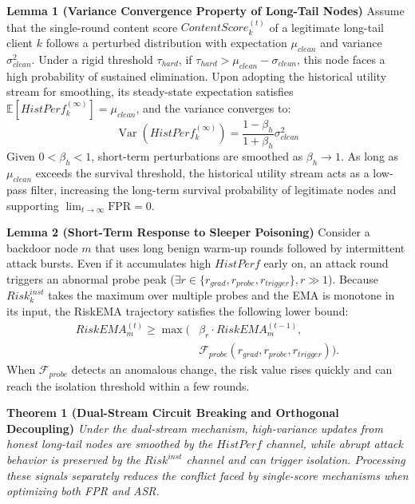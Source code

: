 \documentclass[final,5p,times,twocolumn]{elsarticle/elsarticle}
\begin{document}
\textbf{Lemma 1 (Variance Convergence Property of Long-Tail Nodes)}
Assume that the single-round content score $ContentScore_{k}^{(t)}$ of a legitimate long-tail client $k$ follows a perturbed distribution with expectation $\mu_{clean}$ and variance $\sigma_{clean}^2$. Under a rigid threshold $\tau_{hard}$, if $\tau_{hard} > \mu_{clean} - \sigma_{clean}$, this node faces a high probability of sustained elimination. Upon adopting the historical utility stream for smoothing, its steady-state expectation satisfies $\mathbb{E}[HistPerf_k^{(\infty)}] = \mu_{clean}$, and the variance converges to:
\begin{equation}
    \operatorname{Var}(HistPerf_{k}^{(\infty)}) = \frac{1-\beta_h}{1+\beta_h} \sigma_{clean}^{2}
\end{equation}
Given $0 < \beta_h < 1$, short-term perturbations are smoothed as $\beta_h \to 1$. As long as $\mu_{clean}$ exceeds the survival threshold, the historical utility stream acts as a low-pass filter, increasing the long-term survival probability of legitimate nodes and supporting $\lim_{t \to \infty} \text{FPR} = 0$.

\textbf{Lemma 2 (Short-Term Response to Sleeper Poisoning)}
Consider a backdoor node $m$ that uses long benign warm-up rounds followed by intermittent attack bursts. Even if it accumulates high $HistPerf$ early on, an attack round triggers an abnormal probe peak ($\exists r \in \{r_{grad}, r_{probe}, r_{trigger}\}, r \gg 1$). Because $Risk_k^{inst}$ takes the maximum over multiple probes and the EMA is monotone in its input, the RiskEMA trajectory satisfies the following lower bound:
\begin{equation}
    \begin{aligned}
        RiskEMA_m^{(t)} \ge
        \max \big( & \beta_r \cdot RiskEMA_m^{(t-1)},                             \\
                   & \mathcal{F}_{probe}(r_{grad}, r_{probe}, r_{trigger}) \big).
    \end{aligned}
\end{equation}
When $\mathcal{F}_{probe}$ detects an anomalous change, the risk value rises quickly and can reach the isolation threshold within a few rounds.

\textbf{Theorem 1 (Dual-Stream Circuit Breaking and Orthogonal Decoupling)}
\textit{Under the dual-stream mechanism, high-variance updates from honest long-tail nodes are smoothed by the $HistPerf$ channel, while abrupt attack behavior is preserved by the $Risk^{inst}$ channel and can trigger isolation. Processing these signals separately reduces the conflict faced by single-score mechanisms when optimizing both FPR and ASR.}
\end{document}
